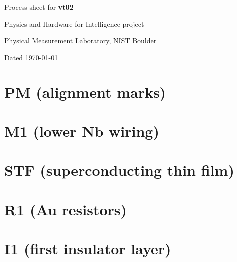 \documentclass[]{article}
\begin{document}
\centerline{\LARGE Process sheet for \textbf{vt02}}
\vspace{0.5em}
\centerline{\Large Physics and Hardware for Intelligence project}
\vspace{0.5em}
\centerline{\large Physical Measurement Laboratory, NIST Boulder}
\vspace{0.5em}
\centerline{Dated \today}

\begin{figure}[!h]
\centering
\setlength{\fboxsep}{0pt}%
\setlength{\fboxrule}{0pt}%
\end{figure}

\begin{abstract}

\vspace{1em}
\end{abstract}

\begin{multicols}{2}
\setcounter{tocdepth}{2}
\setcounter{secnumdepth}{4}
\tableofcontents
\end{multicols}
\newpage

\section{\label{sec:pm}PM (alignment marks)}


\section{\label{sec:m1}M1 (lower Nb wiring)}


\section{\label{sec:stf}STF (superconducting thin film)}


\section{\label{sec:r1}R1 (Au resistors)}


\section{\label{sec:i1}I1 (first insulator layer)}

\end{document}
